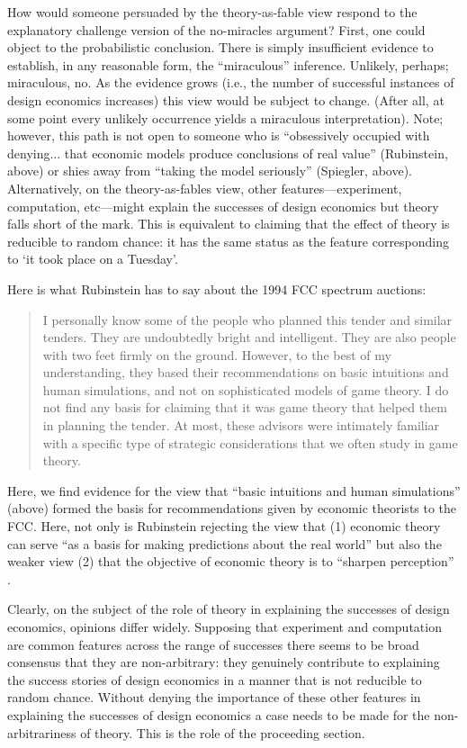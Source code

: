 How would someone persuaded by the theory-as-fable view respond to the explanatory challenge version of the no-miracles argument? First, one could object to the probabilistic conclusion. There is simply insufficient evidence to establish, in any reasonable form, the ``miraculous'' inference. Unlikely, perhaps; miraculous, no. As the evidence grows (i.e., the number of successful instances of design economics increases) this view would be subject to change. (After all, at some point every unlikely occurrence yields a miraculous interpretation). Note; however, this path is not open to someone who is ``obsessively occupied with denying... that economic models produce conclusions of real value'' (Rubinstein, above) or shies away from ``taking the model seriously'' (Spiegler, above). Alternatively, on the theory-as-fables view, other features---experiment, computation, etc---might explain the successes of design economics but theory falls short of the mark. This is equivalent to claiming that the effect of theory is reducible to random chance: it has the same status as the feature corresponding to `it took place on a Tuesday'. 

Here is what Rubinstein has to say about the 1994 FCC spectrum auctions:
\begin{quote}
    I personally know some of the people who planned this tender and similar tenders. They are undoubtedly bright and intelligent. They are also people with two feet firmly on the ground. However, to the best of my understanding, they based their recommendations on basic intuitions and human simulations, and not on sophisticated models of game theory. I do not find any basis for claiming that it was game theory that helped them in planning the tender. At most, these advisors were intimately familiar with a specific type of strategic considerations that we often study in game theory. \autocite[125]{rubinstein2012}
\end{quote}
Here, we find evidence for the view that ``basic intuitions and human simulations'' (above) formed the basis for recommendations given by economic theorists to the FCC. Here, not only is Rubinstein rejecting the view that (1) economic theory can serve ``as a basis for making predictions about the real world'' \autocite[34]{rubinstein2012} but also the weaker view (2) that the objective of economic theory is to ``sharpen perception'' \autocite[34]{rubinstein2012}. 

Clearly, on the subject of the role of theory in explaining the successes of design economics, opinions differ widely. Supposing that experiment and computation are common features across the range of successes there seems to be broad consensus that they are non-arbitrary: they genuinely contribute to explaining the success stories of design economics in a manner that is not reducible to random chance. Without denying the importance of these other features in explaining the successes of design economics a case needs to be made for the non-arbitrariness of theory. This is the role of the proceeding section.







